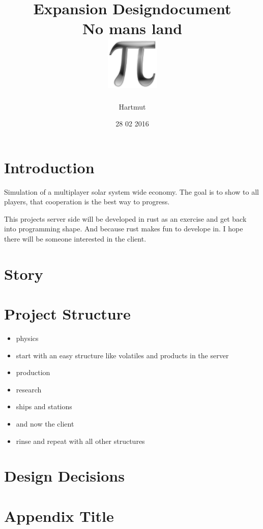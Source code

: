 \documentclass[a4paper,10pt]{book}
\title{
	{Expansion Designdocument}\\
	{\large No mans land}\\
	{\includegraphics{pi-black.png}}
}
\author{Hartmut}
\date{28 02 2016}
\begin{document}
\maketitle

\tableofcontents
\chapter{Introduction}
Simulation of a multiplayer solar system wide economy.
The goal is to show to all players, that cooperation is the best way to progress.

This projects server side will be developed in rust as an exercise and get back into 
programming shape. And because rust makes fun to develope in. I hope there will be someone
interested in the client.

\chapter{Story}


\chapter{Project Structure}
\begin{itemize}
 \item physics
 \item start with an easy structure like volatiles and products in the server
 \item production
 \item research
 \item ships and stations
 \item and now the client
 \item rinse and repeat with all other structures
\end{itemize}


\chapter{Design Decisions}


\appendix
\chapter{Appendix Title}

\end{document}
